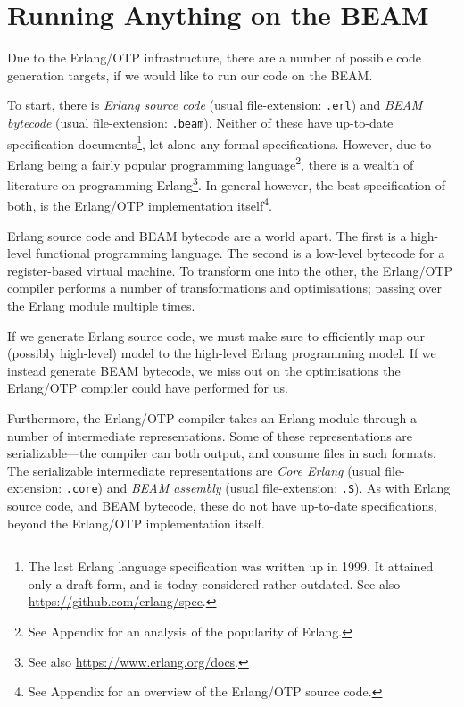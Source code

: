 \section{Running Anything on the BEAM}

Due to the Erlang/OTP infrastructure, there are a number of possible
code generation targets, if we would like to run our code on the BEAM.

To start, there is \emph{Erlang source code} (usual file-extension:
\texttt{.erl}) and \emph{BEAM bytecode} (usual file-extension:
\texttt{.beam}). Neither of these have up-to-date specification
documents\footnote{The last Erlang language specification was written
up in 1999\cite{erlang:1999:spec}. It attained only a draft form, and
is today considered rather outdated.  See also
\url{https://github.com/erlang/spec}.}, let alone any formal
specifications. However, due to Erlang being a fairly popular
programming language\footnote{See Appendix
 for an analysis of the popularity
of Erlang.}, there is a wealth of literature on programming
Erlang\footnote{See also \url{https://www.erlang.org/docs}.}.  In
general however, the best specification of both, is the Erlang/OTP
implementation itself\footnote{See Appendix
 for an overview of the
Erlang/OTP source code.}.

Erlang source code and BEAM bytecode are a world apart. The first is a
high-level functional programming language. The second is a low-level
bytecode for a register-based virtual machine. To transform one into
the other, the Erlang/OTP compiler performs a number of
transformations and optimisations; passing over the Erlang module
multiple times.

If we generate Erlang source code, we must make sure to efficiently
map our (possibly high-level) model to the high-level Erlang
programming model. If we instead generate BEAM bytecode, we miss out
on the optimisations the Erlang/OTP compiler could have performed for
us.

Furthermore, the Erlang/OTP compiler takes an Erlang module through a
number of intermediate representations. Some of these representations
are serializable---the compiler can both output, and consume files in
such formats. The serializable intermediate representations are
\emph{Core Erlang} (usual file-extension: \texttt{.core}) and
\emph{BEAM assembly} (usual file-extension: \texttt{.S}). As with
Erlang source code, and BEAM bytecode, these do not have up-to-date
specifications, beyond the Erlang/OTP implementation itself.

